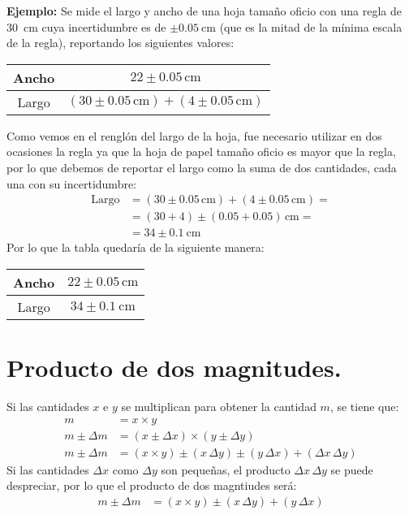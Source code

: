 \documentclass[14pt]{extarticle}
\begin{document}
\vspace*{1cm}
\noindent
\textbf{Ejemplo:} Se mide el largo y ancho de una hoja tamaño oficio con una regla de \SI{30}{\centi\meter} cuya incertidumbre es de $\pm \SI{0.05}{\centi\meter}$ (que es la mitad de la mínima escala de la regla), reportando los siguientes valores:
\begin{table}[H]
    \centering
    \begin{tabular}{| c | c |} \hline
        Ancho & $\num{22} \pm \num{0.05} \, \unit{\centi\meter}$ \\ \hline
        Largo & $(\num{30} \pm \num{0.05} \, \unit{\centi\meter}) + (\num{4} \pm \num{0.05} \, \unit{\centi\meter})$ \\ \hline
    \end{tabular}
\end{table}
Como vemos en el renglón del largo de la hoja, fue necesario utilizar en dos ocasiones la regla ya que la hoja de papel tamaño oficio es mayor que la regla, por lo que debemos de reportar el largo como la suma de dos cantidades, cada una con su incertidumbre:
\begin{align*}
\text{Largo} &= (\num{30} \pm \num{0.05} \, \unit{\centi\meter}) + (\num{4} \pm \num{0.05} \, \unit{\centi\meter}) = \\[0.5em]
&= (30 + 4) \pm (\num{0.05} + \num{0.05}) \, \unit{\centi\meter} = \\[0.5em]
&= \num{34} \pm \SI{0.1}{\centi\meter}
\end{align*}
Por lo que la tabla quedaría de la siguiente manera:
\begin{table}[H]
\centering
\begin{tabular}{| c | c |} \hline
    Ancho & $\num{22} \pm \num{0.05} \, \unit{\centi\meter}$ \\ \hline
    Largo & $\num{34} \pm \SI{0.1}{\centi\meter}$ \\ \hline
\end{tabular}
\end{table}

\section{Producto de dos magnitudes.}

Si las cantidades $x$ e $y$ se multiplican para obtener la cantidad $m$, se tiene que:
\begin{align*}
m &= x \times y \\[0.5em]
m \pm \Delta m &= (x \pm \Delta x) \times (y \pm \Delta y) \\[0.5em]
m \pm \Delta m &= (x \times y) \pm (x \, \Delta y) \pm (y \, \Delta x) + ( \Delta x \, \Delta y)
\end{align*}
Si las cantidades $\Delta x$ como $\Delta y$ son pequeñas, el producto $\Delta x \, \Delta y$ se puede despreciar, por lo que el producto de dos magntiudes será:
\begin{align*}
m \pm \Delta m &= (x \times y) \pm (x \, \Delta y) + (y \, \Delta x)
\end{align*}
\end{document}
